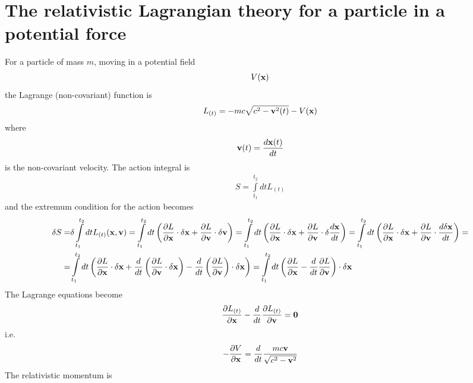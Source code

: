 
\section{The relativistic Lagrangian theory for a particle in a potential force}

For a particle of mass $m$, moving in a potential field
\begin{align}
  V({\bf x})
\end{align}
the Lagrange (non-covariant) function is
\begin{align}
  L_{(t)}=-m c \sqrt{c^{2}-{{\bf v}}^{2}(t)}-V({\bf x})
\end{align}
where
\begin{align}
  {\bf v}(t) = \frac{d{\bf x}(t)}{dt}
\end{align}
is the non-covariant velocity. The action integral is
\begin{align}
  S=\int\limits_{t_1}^{t_2} d t L_{(t)}
\end{align}
and the extremum condition for the action becomes
\begin{align}
  \delta S=&\delta \int\limits_{t_1}^{t_2}dt L_{(t)}({\bf x},{\bf v})=\int\limits_{t_1}^{t_2}dt\left(\frac{\partial L}{\partial {\bf x}}\cdot\delta{\bf x}+\frac{\partial L}{\partial {\bf v}}\cdot\delta{\bf v}\right)=\int\limits_{t_1}^{t_2}dt\left(\frac{\partial L}{\partial {\bf x}}\cdot\delta{\bf x}+\frac{\partial L}{\partial {\bf v}}\cdot\delta{\frac{d{\bf x}}{dt}}\right)=\int\limits_{t_1}^{t_2}dt\left(\frac{\partial L}{\partial {\bf x}}\cdot\delta{\bf x}+\frac{\partial L}{\partial {\bf v}}\cdot{\frac{d{\delta\bf x}}{dt}}\right)=\nonumber\\
  =&\int\limits_{t_1}^{t_2}dt\left(\frac{\partial L}{\partial {\bf x}}\cdot\delta{\bf x}+\frac{d}{dt}\left(\frac{\partial L}{\partial {\bf v}}\cdot\delta{\bf x}\right)-\frac{d}{dt}\left(\frac{\partial L}{\partial {\bf v}}\right)\cdot\delta{\bf x}\right)=\int\limits_{t_1}^{t_2}dt\left(\frac{\partial L}{\partial {\bf x}}-\frac{d}{dt}\frac{\partial L}{\partial {\bf v}}\right)\cdot\delta{\bf x}
\end{align}
The Lagrange equations become
\begin{align}
  \frac{\partial L_{(t)}}{\partial {\bf x}}-\frac{d}{dt}\frac{\partial L_{(t)}}{\partial {\bf v}}={\bf 0}
\end{align}
i.e.
\begin{align}
  -\frac{\partial V}{\partial{\bf x}}=\frac{d}{dt}\frac{mc{\bf v}}{\sqrt{c^2-{\bf v}^2}}
\end{align}
The relativistic momentum is
